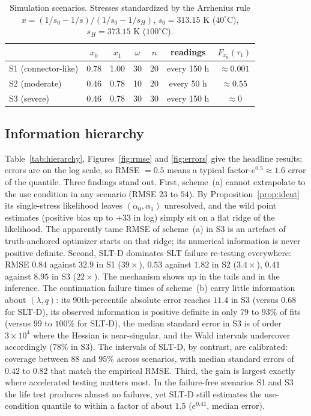 \documentclass[11pt]{article}
\newcommand{\SLTD}{SLT-D}
\begin{document}
\begin{table}[t]
\centering\small
\caption{Simulation scenarios. Stresses standardized by the Arrhenius rule
$x=(1/s_0-1/s)/(1/s_0-1/s_H)$, $s_0=313.15$ K ($40^\circ$C), $s_H=373.15$ K ($100^\circ$C).}
\label{tab:scen}
\begin{tabular}{lcccccc}
\toprule
& $x_0$ & $x_1$ & $\omega$ & $n$ & readings & $F_{x_0}(\tau_1)$\\
\midrule
S1 (connector-like) & 0.78 & 1.00 & 30 & 20 & every 150 h & $\approx0.001$\\
S2 (moderate)       & 0.46 & 0.78 & 10 & 20 & every 50 h  & $\approx0.55$\\
S3 (severe)         & 0.46 & 0.78 & 30 & 30 & every 150 h & $\approx0$\\
\bottomrule
\end{tabular}
\end{table}

\subsection{Information hierarchy}

Table~\ref{tab:hierarchy}, Figures~\ref{fig:rmse} and \ref{fig:errors} give the
headline results; errors are on the
log scale, so RMSE $=0.5$ means a typical factor-$e^{0.5}\approx1.6$ error of the quantile.
Three findings stand out. First, scheme~(a) cannot extrapolate to the use condition in any
scenario (RMSE $23$ to $54$). By Proposition~\ref{prop:ident} its single-stress likelihood
leaves $(\alpha_0,\alpha_1)$ unresolved, and the wild point estimates (positive bias up to
$+33$ in log) simply sit on a flat ridge of the likelihood. The apparently tame RMSE of
scheme~(a) in S3 is an artefact of truth-anchored optimizer starts on that ridge; its
numerical information is never positive definite. Second, \SLTD{} dominates SLT failure
re-testing everywhere: RMSE $0.84$ against $32.9$ in S1 ($39\times$), $0.53$ against $1.82$
in S2 ($3.4\times$), $0.41$ against $8.95$ in S3 ($22\times$). The mechanism shows up in the
tails and in the inference. The continuation failure times of scheme~(b) carry little
information about $(\lambda,q)$: its 90th-percentile absolute error reaches $11.4$ in S3
(versus $0.68$ for \SLTD{}), its observed information is positive definite in only
$79$ to $93\%$ of fits (versus $99$ to $100\%$ for \SLTD{}), the median standard error in S3
is of order $3\times10^{4}$ where the Hessian is near-singular, and the Wald intervals
undercover accordingly ($78\%$ in S3). The intervals of \SLTD{}, by contrast, are calibrated:
coverage between $88$ and $95\%$ across scenarios, with median standard errors of $0.42$ to
$0.82$ that match the empirical RMSE. Third, the gain is largest exactly where accelerated
testing matters most. In the failure-free scenarios S1 and S3 the life test produces almost no
failures, yet \SLTD{} still estimates the use-condition quantile to within a factor of about
$1.5$ ($e^{0.41}$, median error).
\end{document}
